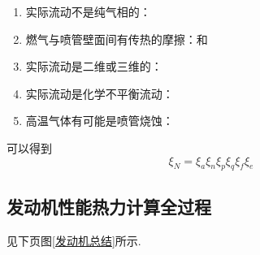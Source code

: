 \sssection[喷管中的实际流动过程与损失]\vspace*{-1em}
\begin{enumerate}[\hspace*{1.5em} (1) ]
	\item 实际流动不是纯气相的：\vspace*{-0.5em}
	\item 燃气与喷管壁面间有传热的摩擦：和\vspace*{-0.5em}
	\item 实际流动是二维或三维的：\vspace*{-0.5em}
	\item 实际流动是化学不平衡流动：\vspace*{-0.5em}
	\item 高温气体有可能是喷管烧蚀：
\end{enumerate}
可以得到
\begin{equation}
	\xi_N = \xi_a \xi_n \xi_p \xi_q \xi_f \xi_e
\end{equation}

\subsection{发动机性能热力计算全过程}
见下页图\ref{发动机总结}所示.
\clearpage

